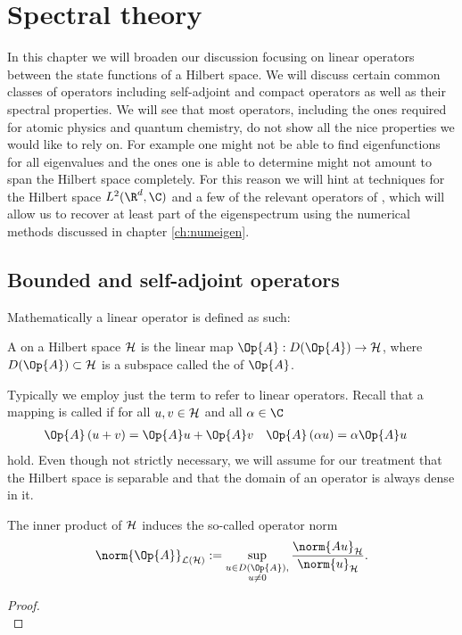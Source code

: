 \section{Spectral theory}
\label{sec:spectral}

In this chapter we will broaden our discussion focusing
on linear operators between the state functions of a Hilbert space.
We will discuss certain common classes of operators
including self-adjoint and compact operators as well as their spectral properties.
We will see that most operators, including the ones required for
atomic physics and quantum chemistry,
do not show all the nice properties we would like to rely on.
For example one might not be able to find eigenfunctions
for all eigenvalues and the ones one is able to determine
might not amount to span the Hilbert space completely.
For this reason we will hint at techniques for the Hilbert space
$L^2(\R^d, \C)$ and a few of the relevant operators of \QM,
which will allow us to recover at least part of the eigenspectrum
using the numerical methods discussed in chapter \vref{ch:numeigen}.

\subsection{Bounded and self-adjoint operators}

Mathematically a linear operator is defined as such:
\begin{defn}
	A  on a Hilbert space $\mathcal{H}$
	is the linear map $\Op{A} : D(\Op{A}) \to \hilbert$,
	where $D(\Op{A}) \subset \hilbert$ is a subspace
	called the  of $\Op{A}$.
\end{defn}
Typically we employ just the term  to refer to linear operators.
Recall that a mapping is called  if
for all $u, v \in \mathcal{H}$ and all $\alpha \in \C$
\begin{align}
	\label{eqn:OperatorLinear}
	\Op{A}\left(u + v\right) &= \Op{A}u + \Op{A}v &
	\Op{A}\left(\alpha u\right) &= \alpha \Op{A}u
\end{align}
hold.
Even though not strictly necessary, we will assume for our treatment
that the Hilbert space is separable and that the domain of an operator
is always dense in it.

\newcommand{\opnorm}[1]{\norm{#1}_{\mathcal{L}(\hilbert)}}
\begin{prop}
	The inner product of $\mathcal{H}$ induces the so-called operator norm
	\[ \opnorm{\Op{A}} := \sup_{\substack{u \in D(\Op{A}),\\ u\neq0}}
		\frac{\norm{A u}_\hilbert}{\norm{u}_{\hilbert}}. \]
	\begin{proof}
		~ \\
	\end{proof}
\end{prop}

